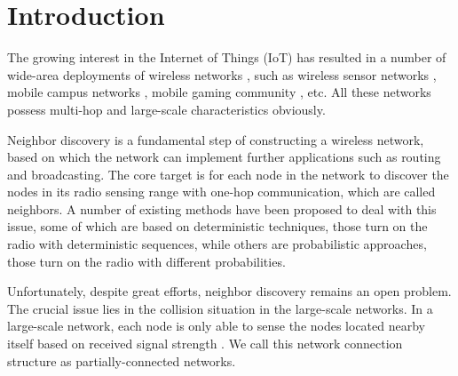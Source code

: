\section{Introduction}








The growing interest in the Internet of Things (IoT) has resulted 
in a number of wide-area deployments of wireless networks \cite{qin2014software},
such as wireless sensor networks \cite{yick2008wireless}, mobile campus networks 
\cite{hernandez2005comparative}, mobile gaming community \cite{cunningham2002optimizing}, etc.
All these networks possess multi-hop and large-scale characteristics obviously.

Neighbor discovery is a fundamental step of constructing a wireless network, based on 
which the network can implement further applications such as routing and broadcasting.
The core target is for each node in the network to discover the nodes in its radio sensing range 
with one-hop communication, which are called neighbors. 
A number of existing methods \cite{dutta2008practical,kandhalu2010u,
bakht2012searchlight,sun2014hello,chen2015heterogeneous,
wang2015blinddate,qiu2016talk,mcglynn2001birthday,
vasudevan2009neighbor,you2011aloha,song2014probabilistic} have been proposed 
to deal with this issue, some of which are based on deterministic techniques, 
those turn on the radio with deterministic sequences,
 while others are probabilistic approaches, those turn on the radio with different probabilities.


Unfortunately, despite great efforts, neighbor discovery remains an open problem.
The crucial issue lies in the collision situation in the large-scale networks.
In a large-scale network, each node is only able to sense the 
nodes located nearby itself based on received signal strength \cite{wang2013gaussian}.  
We call this network connection structure as partially-connected networks.


